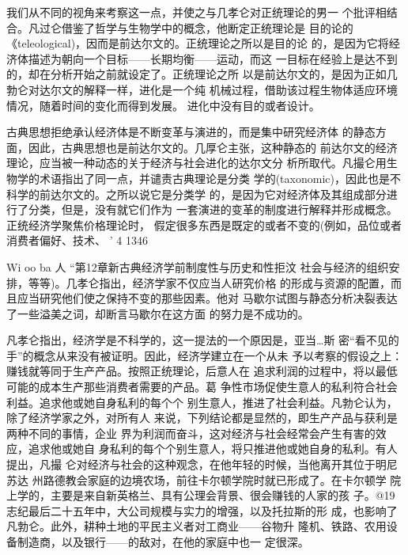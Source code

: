 我们从不同的视角来考察这一点，并使之与几孝仑对正统理论的男一
个批评相结合。凡过仑借鉴了哲学与生物学中的概念，他断定正统理论是
目的论的《teleological)，因而是前达尔文的。正统理论之所以是目的论
的，是因为它将经济体描述为朝向一个目标——长期均衡——运动，而这
一目标在经验上是达不到的，却在分析开始之前就设定了。正统理论之所
以是前达尔文的，是因为正如几勃仑对达尔文的解释一样，进化是一个纯
机械过程，借助该过程生物体适应环境情况，随着时间的变化而得到发展。
进化中没有目的或者设计。

古典思想拒绝承认经济体是不断变革与演进的，而是集中研究经济体
的静态方面，因此，古典思想也是前达尔文的。几厚仑主张，这种静态的
前达尔文的经济理论，应当被一种动态的关于经济与社会进化的达尔文分
析所取代。凡撮仑用生物学的术语指出了同一点，并谴责古典理论是分类
学的(taxonomic)，因此也是不科学的前达尔文的。之所以说它是分类学
的，是因为它对经济体及其组成部分进行了分类，但是，没有就它们作为
一套演进的变革的制度进行解释并形成概念。正统经济学聚焦价格理论时，
假定很多东西是既定的或者不变的(例如，品位或者消费者偏好、技术、
'
4
1346

Wi
oo
ba
人
“第12章新古典经济学前制度性与历史和性拒汶
社会与经济的组织安排，等等)。几孝仑指出，经济学家不仅应当人研究价格
的形成与资源的配置，而且应当研究他们使之保持不变的那些因素。他对
马歇尔试图与静态分析决裂表达了一些溢美之词，却断言马歇尔在这方面
的努力是不成功的。

凡孝仑指出，经济学是不科学的，这一提法的一个原因是，亚当…斯
密“看不见的手”的概念从来没有被证明。因此，经济学建立在一个从未
予以考察的假设之上：赚钱就等同于生产产品。按照正统理论，后意人在
追求利润的过程中，将以最低可能的成本生产那些消费者需要的产品。葛
争性市场促使生意人的私利符合社会利益。追求他或她自身私利的每个个
别生意人，推进了社会利益。凡勃仑认为，除了经济学家之外，对所有人
来说，下列结论都是显然的，即生产产品与获利是两种不同的事情，企业
界为利润而奋斗，这对经济与社会经常会产生有害的效应，追求他或她自
身私利的每个个别生意人，将只推进他或她自身的私利。有人提出，凡撮
仑对经济与社会的这种观念，在他年轻的时候，当他离开其位于明尼苏达
州路德教会家庭的边境农场，前往卡尔顿学院时就已形成了。在卡尔顿学
院上学的，主要是来自新英格兰、具有公理会背景、很会赚钱的人家的孩
子。@19志纪最后二十五年中，大公司规模与实力的增强，以及托拉斯的形
成，也影响了凡勃仑。此外，耕种土地的平民主义者对工商业——谷物升
隆机、铁路、农用设备制造商，以及银行——的敌对，在他的家庭中也一
定很深。

